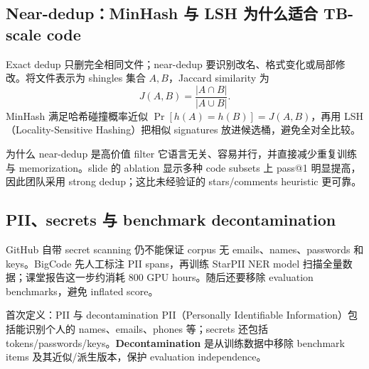 
\subsection{Near-dedup：MinHash 与 LSH 为什么适合 TB-scale code}

Exact dedup 只删完全相同文件；near-dedup 要识别改名、格式变化或局部修改。将文件表示为 shingles 集合 $A,B$，Jaccard similarity 为
\[
J(A,B)=\frac{|A\cap B|}{|A\cup B|}.
\]
MinHash 满足哈希碰撞概率近似 $\Pr[h(A)=h(B)]=J(A,B)$，再用 LSH（Locality-Sensitive Hashing）把相似 signatures 放进候选桶，避免全对全比较。


\begin{importantbox}{为什么 near-dedup 是高价值 filter}
它语言无关、容易并行，并直接减少重复训练与 memorization。slide 的 ablation 显示多种 code subsets 上 pass@1 明显提高，因此团队采用 strong dedup；这比未经验证的 stars/comments heuristic 更可靠。
\end{importantbox}


\subsection{PII、secrets 与 benchmark decontamination}

GitHub 自带 secret scanning 仍不能保证 corpus 无 emails、names、passwords 和 keys。BigCode 先人工标注 PII spans，再训练 StarPII NER model 扫描全量数据；课堂报告这一步约消耗 800 GPU hours。随后还要移除 evaluation benchmarks，避免 inflated score。


\begin{knowledgebox}{首次定义：PII 与 decontamination}
PII（Personally Identifiable Information）包括能识别个人的 names、emails、phones 等；secrets 还包括 tokens/passwords/keys。\textbf{Decontamination} 是从训练数据中移除 benchmark items 及其近似/派生版本，保护 evaluation independence。
\end{knowledgebox}

